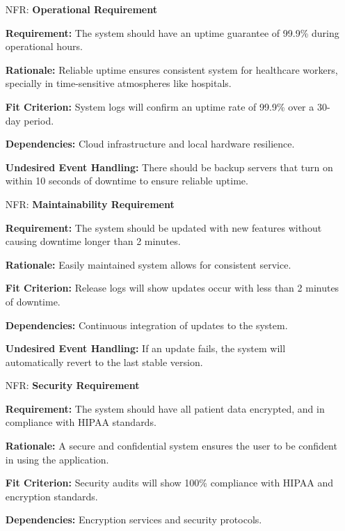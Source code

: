 \documentclass[12pt]{article}
\newcounter{nfrnum} %
\begin{document}
\begin{itemize}
\begin{itemize}
\item[NFR\refstepcounter{nfrnum}\thenfrnum \label{NFR_Operational}:] \textbf{Operational Requirement}

    \textbf{Requirement:} The system should have an uptime guarantee of 99.9\% during operational hours.

    \textbf{Rationale:} Reliable uptime ensures consistent system for healthcare workers, specially in time-sensitive atmospheres like hospitals.

    \textbf{Fit Criterion:} System logs will confirm an uptime rate of 99.9\% over a 30-day period.  

    \textbf{Dependencies:} Cloud infrastructure and local hardware resilience. 
    
    \textbf{Undesired Event Handling:} There should be backup servers that turn on within 10 seconds of downtime to ensure reliable uptime.

\item[NFR\refstepcounter{nfrnum}\thenfrnum \label{NFR_Maintainability}:] \textbf{Maintainability Requirement}

    \textbf{Requirement:} The system should be updated with new features without causing downtime longer than 2 minutes.

    \textbf{Rationale:} Easily maintained system allows for consistent service.

    \textbf{Fit Criterion:} Release logs will show updates occur with less than 2 minutes of downtime.  

    \textbf{Dependencies:} Continuous integration of updates to the system.  

    \textbf{Undesired Event Handling:} If an update fails, the system will automatically revert to the last stable version.

\item[NFR\refstepcounter{nfrnum}\thenfrnum \label{NFR_Security}:] \textbf{Security Requirement}

    \textbf{Requirement:} The system should have all patient data encrypted, and in compliance with HIPAA standards.

    \textbf{Rationale:} A secure and confidential system ensures the user to be confident in using the application.

    \textbf{Fit Criterion:} Security audits will show 100\% compliance with HIPAA and encryption standards.  

    \textbf{Dependencies:} Encryption services and security protocols.  


\end{itemize}
\end{itemize}
\end{document}
